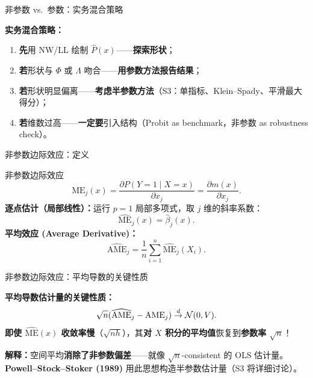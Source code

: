 \documentclass[aspectratio=169, 10pt]{beamer}
\begin{document}
\begin{frame}{非参数 vs.\ 参数：实务混合策略}

  \begin{keybox}
    \textbf{实务混合策略：}
    \begin{enumerate}
      \item \textbf{先}用 NW/LL 绘制 $\hat P(x)$——\textbf{探索形状}；
      \item \textbf{若}形状与 $\Phi$ 或 $\Lambda$ 吻合——\textbf{用参数方法报告结果}；
      \item \textbf{若}形状明显偏离——\textbf{考虑半参数方法}（S3：单指标、Klein--Spady、平滑最大得分）；
      \item \textbf{若}维数过高——\textbf{一定要}引入结构（Probit as benchmark，非参数 as robustness check）。
    \end{enumerate}
  \end{keybox}

\end{frame}


\begin{frame}{非参数边际效应：定义}

  \begin{definitionbox}{非参数边际效应}
    \[
      \text{ME}_j(x) = \frac{\partial P(Y=1\mid X=x)}{\partial x_j} = \frac{\partial m(x)}{\partial x_j}.
    \]
    \textbf{逐点估计（局部线性）：}运行 $p=1$ 局部多项式，取 $j$ 维的斜率系数：
    \[
      \hat{\text{ME}}_j(x) = \hat\beta_j(x).
    \]
    \textbf{平均效应 (Average Derivative)：}
    \[
      \widehat{\text{AME}}_j = \frac{1}{n}\sum_{i=1}^n \hat{\text{ME}}_j(X_i).
    \]
  \end{definitionbox}

\end{frame}


\begin{frame}{非参数边际效应：平均导数的关键性质}

  \begin{highlightbox}
    \textbf{平均导数估计量的关键性质：}
    \[
      \sqrt{n}(\widehat{\text{AME}}_j - \text{AME}_j) \overset{d}{\to} \mathcal{N}(0, V).
    \]
    \textbf{即使 $\hat{\text{ME}}(x)$ 收敛率慢}（$\sqrt{nh}$），其\textbf{对 $X$ 积分的平均值}恢复到\textbf{参数率 $\sqrt{n}$}！
  \end{highlightbox}

  \begin{keybox}
    \textbf{解释：}空间平均\textbf{消除了非参数偏差}——就像 $\sqrt{n}$-consistent 的 OLS 估计量。
    \textbf{Powell--Stock--Stoker (1989)} 用此思想构造半参数估计量（S3 将详细讨论）。
  \end{keybox}

\end{frame}
\end{document}
